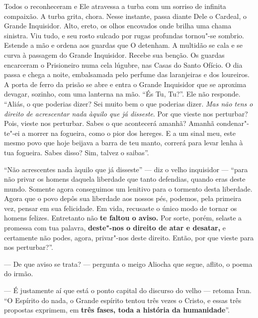 Todos o reconheceram e Ele atravessa a turba com um sorriso de infinita
compaixão. A turba grita, chora. Nesse instante, passa diante Dele o
Cardeal, o Grande Inquisidor. Alto, ereto, os olhos encovados onde
brilha uma chama sinistra. Viu tudo, e seu rosto sulcado por rugas
profundas tornou"-se sombrio. Estende a mão e ordena aos guardas que O
detenham. A multidão se cala e se curva à passagem do Grande Inquisidor.
Recebe sua benção. Os guardas encarceram o Prisioneiro numa cela
lúgubre, nas Casas do Santo Ofício. O dia passa e chega a noite,
embalsamada pelo perfume das laranjeiras e dos loureiros. A porta de
ferro da prisão se abre e entra o Grande Inquisidor que se aproxima
devagar, sozinho, com uma lanterna na mão. ``És Tu, Tu?''. Ele não
responde. ``Aliás, o que poderias dizer? Sei muito bem o que poderias
dizer. \emph{Mas não tens o direito de acrescentar nada àquilo que já
disseste}. Por que vieste nos perturbar? Pois, vieste nos perturbar.
Sabes o que acontecerá amanhã? Amanhã condenar"-te"-ei a morrer na
fogueira, como o pior dos hereges. E a um sinal meu, este mesmo povo que
hoje beijava a barra de teu manto, correrá para levar lenha à tua
fogueira. Sabes disso? Sim, talvez o saibas''.

``Não acrescentes nada àquilo que já disseste'' --- diz o velho
inquisidor --- ``para não privar os homens daquela liberdade que tanto
defendias, quando eras deste mundo. Somente agora conseguimos um
lenitivo para o tormento desta liberdade. Agora que o povo depôs sua
liberdade aos nossos pés, podemos, pela primeira vez, pensar em sua
felicidade. Em vida, recusaste o único modo de tornar os homens felizes.
Entretanto não \textbf{te faltou o aviso.} Por sorte, porém, selaste a
promessa com tua palavra, \textbf{deste"-nos o direito de atar e
desatar,} e certamente não podes, agora, privar"-nos deste direito.
Então, por que vieste para nos perturbar?''.

--- De que aviso se trata? --- pergunta o meigo Aliocha que segue, aflito,
o poema do irmão.

--- É justamente aí que está o ponto capital do discurso do velho ---
retoma Ivan. ``O Espírito do nada, o Grande espírito tentou três vezes o
Cristo, e essas três propostas exprimem, em \textbf{três fases, toda a
história da humanidade}''.

